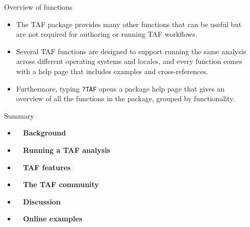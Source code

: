 \documentclass[aspectratio=169]{beamer}
\begin{document}
\begin{frame}{Overview of functions}\small
  \begin{itemize}
    \item[] The TAF package provides many other functions that can be useful
    but\\[0.2ex]
    are not required for authoring or running TAF workflows.\\[4ex]
    \item[] Several TAF functions are designed to support running the same
    analysis\\[0.2ex]
    across different {\green operating systems} and {\green locales}, and every
    function comes\\[0.2ex]
    with a help page that includes {\green examples} and
    {\green cross-references}.\\[4ex]
    \item[] Furthermore, typing {\tt ?TAF} opens a {\green package help page}
    that gives an\\[0.2ex]
    overview of all the functions in the package, grouped by
    functionality.\\[6ex]
  \end{itemize}
\end{frame}


\begin{frame}{Summary}
  \begin{itemize}
    \item[] {\bf{}~ Background} \\[3ex]
    \item[] {\bf{}~ Running a TAF analysis} \\[3ex]
    \item[] {\bf{}~ TAF features} \\[3ex]
    \item[] {\bf{}~ The TAF community} \\[3ex]
    \item[] {\bf{}~ Discussion} \\[3ex]
    \item[] {\bf{}~ Online examples} \\[3ex]
  \end{itemize}
\end{frame}
\end{document}
